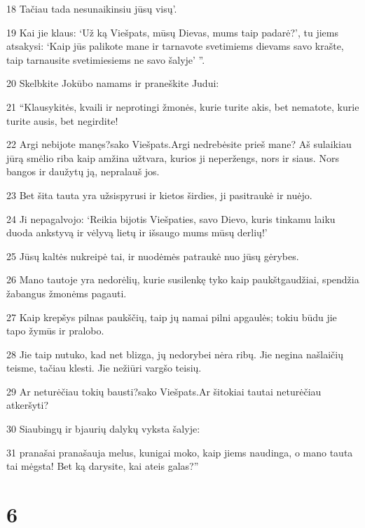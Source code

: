 \par 18 Tačiau tada nesunaikinsiu jūsų visų’. 
\par 19 Kai jie klaus: ‘Už ką Viešpats, mūsų Dievas, mums taip padarė?’, tu jiems atsakysi: ‘Kaip jūs palikote mane ir tarnavote svetimiems dievams savo krašte, taip tarnausite svetimiesiems ne savo šalyje’ ”. 
\par 20 Skelbkite Jokūbo namams ir praneškite Judui: 
\par 21 “Klausykitės, kvaili ir neprotingi žmonės, kurie turite akis, bet nematote, kurie turite ausis, bet negirdite! 
\par 22 Argi nebijote manęs?­sako Viešpats.­Argi nedrebėsite prieš mane? Aš sulaikiau jūrą smėlio riba kaip amžina užtvara, kurios ji neperžengs, nors ir siaus. Nors bangos ir daužytų ją, nepralauš jos. 
\par 23 Bet šita tauta yra užsispyrusi ir kietos širdies, ji pasitraukė ir nuėjo. 
\par 24 Ji nepagalvojo: ‘Reikia bijotis Viešpaties, savo Dievo, kuris tinkamu laiku duoda ankstyvą ir vėlyvą lietų ir išsaugo mums mūsų derlių!’ 
\par 25 Jūsų kaltės nukreipė tai, ir nuodėmės patraukė nuo jūsų gėrybes. 
\par 26 Mano tautoje yra nedorėlių, kurie susilenkę tyko kaip paukštgaudžiai, spendžia žabangus žmonėms pagauti. 
\par 27 Kaip krepšys pilnas paukščių, taip jų namai pilni apgaulės; tokiu būdu jie tapo žymūs ir pralobo. 
\par 28 Jie taip nutuko, kad net blizga, jų nedorybei nėra ribų. Jie negina našlaičių teisme, tačiau klesti. Jie nežiūri vargšo teisių. 
\par 29 Ar neturėčiau tokių bausti?­sako Viešpats.­Ar šitokiai tautai neturėčiau atkeršyti? 
\par 30 Siaubingų ir bjaurių dalykų vyksta šalyje: 
\par 31 pranašai pranašauja melus, kunigai moko, kaip jiems naudinga, o mano tauta tai mėgsta! Bet ką darysite, kai ateis galas?”



\chapter{6}



